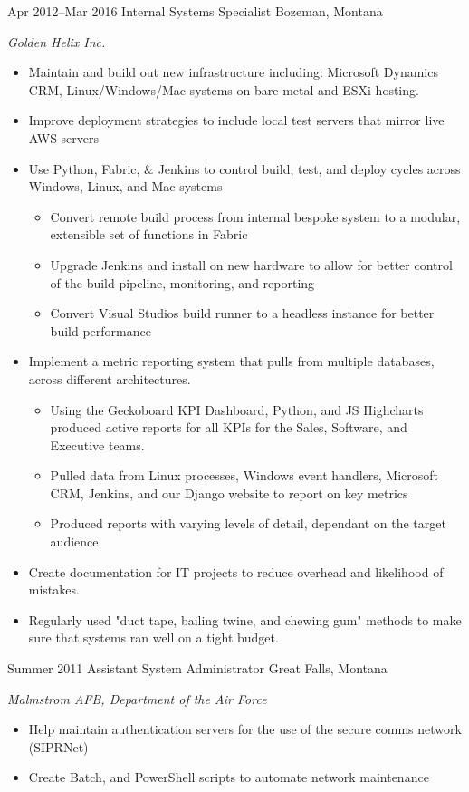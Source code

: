 \documentclass[]{two-column-stats} %
\begin{document}
\begin{entrylist}
\entry
{Apr 2012--Mar 2016}
{Internal Systems Specialist}
{Bozeman, Montana}
{\emph{Golden Helix Inc.}
\begin{itemize}
  \item Maintain and build out new infrastructure including: Microsoft Dynamics CRM, Linux/Windows/Mac systems on bare metal and ESXi hosting.
  \item Improve deployment strategies to include local test servers that mirror live AWS servers
  \item Use Python, Fabric, \& Jenkins to control build, test, and deploy cycles across Windows, Linux, and Mac systems
  \begin{itemize}
    \item Convert remote build process from internal bespoke system to a modular, extensible set of functions in Fabric
    \item Upgrade Jenkins and install on new hardware to allow for better control of the build pipeline, monitoring, and reporting
    \item Convert Visual Studios build runner to a headless instance for better build performance
  \end{itemize}
  \item Implement a metric reporting system that pulls from multiple databases, across different architectures.
  \begin{itemize}
    \item Using the Geckoboard KPI Dashboard, Python, and JS Highcharts produced active reports for all KPIs for the Sales, Software, and Executive teams.
    \item Pulled data from Linux processes, Windows event handlers, Microsoft CRM, Jenkins, and our Django website to report on key metrics
    \item Produced reports with varying levels of detail, dependant on the target audience.
  \end{itemize}
  \item Create documentation for IT projects to reduce overhead and likelihood of mistakes.
  \item Regularly used "duct tape, bailing twine, and chewing gum" methods to make sure that systems ran well on a tight budget.
\end{itemize}
}
\end{entrylist}
\begin{entrylist}
\entry
{Summer 2011}
{Assistant System Administrator}
{Great Falls, Montana}
{\emph{Malmstrom AFB, Department of the Air Force}
\begin{itemize}
  \item Help maintain authentication servers for the use of the secure comms network (SIPRNet)
  \item Create Batch, and PowerShell scripts to automate network maintenance
\end{itemize}
}
\end{entrylist}
\end{document}
